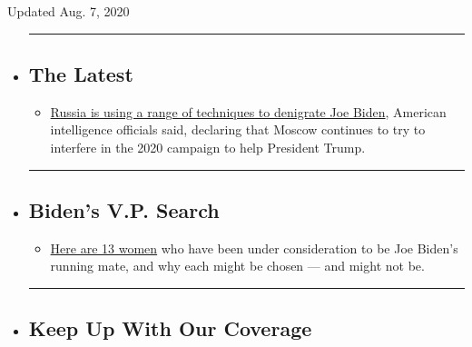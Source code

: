 Updated Aug. 7, 2020

\begin{itemize}
\item
  \begin{center}\rule{0.5\linewidth}{\linethickness}\end{center}

  \hypertarget{the-latest}{%
  \subsection{The Latest}\label{the-latest}}

  \begin{itemize}
  \tightlist
  \item
    \href{https://www.nytimes.com/2020/08/07/us/politics/russia-china-trump-biden-election-interference.html?action=click\&pgtype=Article\&state=default\&region=BELOW_MAIN_CONTENT\&context=storylines_guide}{Russia
    is using a range of techniques to denigrate Joe Biden}, American
    intelligence officials said, declaring that Moscow continues to try
    to interfere in the 2020 campaign to help President Trump.
  \end{itemize}
\item
  \begin{center}\rule{0.5\linewidth}{\linethickness}\end{center}

  \hypertarget{bidens-vp-search}{%
  \subsection{Biden's V.P. Search}\label{bidens-vp-search}}

  \begin{itemize}
  \tightlist
  \item
    \href{https://www.nytimes.com/article/biden-vice-president-2020.html?action=click\&pgtype=Article\&state=default\&region=BELOW_MAIN_CONTENT\&context=storylines_guide}{Here
    are 13 women} who have been under consideration to be Joe Biden's
    running mate, and why each might be chosen --- and might not be.
  \end{itemize}
\item
  \begin{center}\rule{0.5\linewidth}{\linethickness}\end{center}

  \hypertarget{keep-up-with-our-coverage}{%
  \subsection{Keep Up With Our
  Coverage}\label{keep-up-with-our-coverage}}


\end{itemize}
